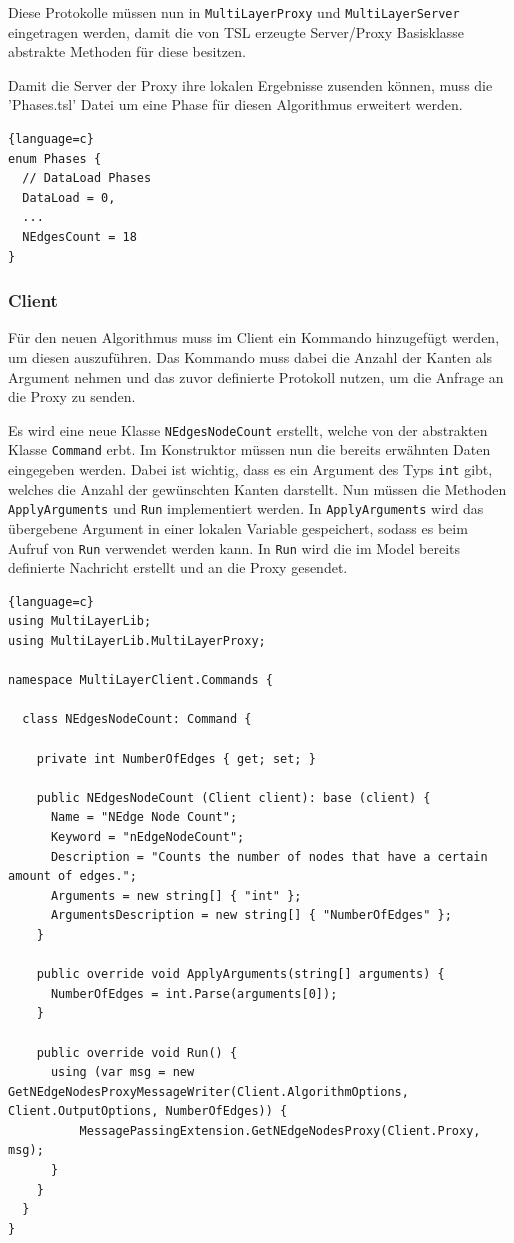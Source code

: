 Diese Protokolle müssen nun in \verb|MultiLayerProxy| und \verb|MultiLayerServer| eingetragen werden, damit die von TSL erzeugte Server/Proxy Basisklasse abstrakte Methoden für diese besitzen.

Damit die Server der Proxy ihre lokalen Ergebnisse zusenden können, muss die 'Phases.tsl' Datei um eine Phase für diesen Algorithmus erweitert werden.

\begin{lstlisting}{language=c}
enum Phases {
  // DataLoad Phases
  DataLoad = 0,
  ...
  NEdgesCount = 18
}
\end{lstlisting}


\subsubsection{Client}

Für den neuen Algorithmus muss im Client ein Kommando hinzugefügt werden, um diesen auszuführen. Das Kommando muss dabei die Anzahl der Kanten als Argument nehmen und das zuvor definierte Protokoll nutzen, um die Anfrage an die Proxy zu senden.

Es wird eine neue Klasse \verb|NEdgesNodeCount| erstellt, welche von der abstrakten Klasse \verb|Command| erbt. Im Konstruktor müssen nun die bereits erwähnten Daten eingegeben werden. Dabei ist wichtig, dass es ein Argument des Typs \verb|int| gibt, welches die Anzahl der gewünschten Kanten darstellt.
Nun müssen die Methoden \verb|ApplyArguments| und \verb|Run| implementiert werden.
In \verb|ApplyArguments| wird das übergebene Argument in einer lokalen Variable gespeichert, sodass es beim Aufruf von \verb|Run| verwendet werden kann.
In \verb|Run| wird die im Model bereits definierte Nachricht erstellt und an die Proxy gesendet.

\begin{lstlisting}{language=c}
using MultiLayerLib;
using MultiLayerLib.MultiLayerProxy;

namespace MultiLayerClient.Commands {

  class NEdgesNodeCount: Command {

    private int NumberOfEdges { get; set; }

    public NEdgesNodeCount (Client client): base (client) {
      Name = "NEdge Node Count";
      Keyword = "nEdgeNodeCount";
      Description = "Counts the number of nodes that have a certain amount of edges.";
      Arguments = new string[] { "int" };
      ArgumentsDescription = new string[] { "NumberOfEdges" };
    }

    public override void ApplyArguments(string[] arguments) {
      NumberOfEdges = int.Parse(arguments[0]);
    }

    public override void Run() {
      using (var msg = new GetNEdgeNodesProxyMessageWriter(Client.AlgorithmOptions, Client.OutputOptions, NumberOfEdges)) {
          MessagePassingExtension.GetNEdgeNodesProxy(Client.Proxy, msg);
      }      
    }
  }
}
\end{lstlisting}


